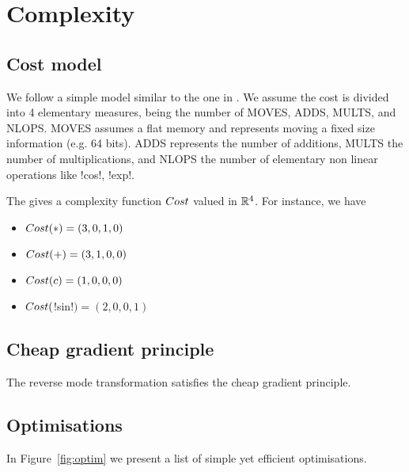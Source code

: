 \section{Complexity}
\label{sec:complexity}

\subsection{Cost model}
\label{sub:costModel}

We follow a simple model similar to the one in \cite{griewank2008evaluating}.
We assume the cost is divided into 4 elementary measures, being the number of MOVES, ADDS, MULTS, and NLOPS.
MOVES assumes a flat memory and represents moving a fixed size information  (e.g. 64 bits). 
ADDS represents the number of additions, 
MULTS the number of multiplications, 
and NLOPS the number of elementary non linear operations like !cos!, !exp!.

The gives a complexity function $Cost$ valued in $\mathbb{R}^4$. 
For instance, we have 

\begin{itemize}
    \item $Cost(*)=(3,0,1,0)$
    \item $Cost(+)=(3,1,0,0)$
    \item $Cost(c)=(1,0,0,0)$
    \item $Cost($!sin!$)=(2,0,0,1)$
\end{itemize}



\subsection{Cheap gradient principle}

\begin{theorem}
    The reverse mode transformation satisfies the cheap gradient principle.
\end{theorem}

\subsection{Optimisations} %
\label{sub:Optimisations}

In Figure~\ref{fig:optim} we present a list of simple yet efficient optimisations.

